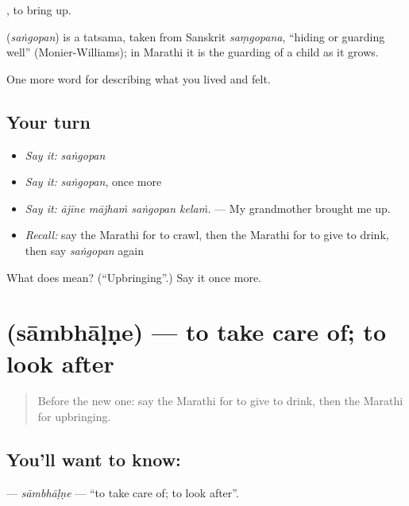  , to bring up.

\begin{cousinweb}
\textbf{} (\emph{saṅgopan}) is a tatsama, taken from Sanskrit \emph{saṃgopana}, \textquotedblleft{}hiding or guarding well\textquotedblright{} (Monier-Williams); in Marathi it is the guarding of a child as it grows.
\end{cousinweb}

\begin{grammarlens}[title={What you've built}]
One more word for describing what you lived and felt.
\end{grammarlens}

\subsection*{Your turn}
\begin{itemize}
\raggedright
  \item \emph{Say it:} \emph{saṅgopan}
  \item \emph{Say it:} \emph{saṅgopan}, once more
  \item \emph{Say it:} \emph{ājīne mājhaṁ saṅgopan kelaṁ.} — My grandmother brought me up.
  \item \emph{Recall:} say the Marathi for to crawl, then the Marathi for to give to drink, then say \emph{saṅgopan} again
\end{itemize}

\begin{tcolorbox}[breakable,colback=teal!4,colframe=teal!35!black,title={Before you move on}]
What does  mean? (\textquotedblleft{}Upbringing\textquotedblright{}.) Say it once more.
\end{tcolorbox}
\section[\texorpdfstring{\mr{सांभाळणे} (sāmbhāḷṇe)}{सांभाळणे (sāmbhāḷṇe)}]{ (sāmbhāḷṇe) — to take care of; to look after}

\label{lesson:MR-C500-sambhalne}



\begin{quote}
Before the new one: say the Marathi for to give to drink, then the Marathi for upbringing.
\end{quote}

\subsection*{You'll want to know: }
\textbf{} — \emph{sāmbhāḷṇe} — \textquotedblleft{}to take care of; to look after\textquotedblright{}.

